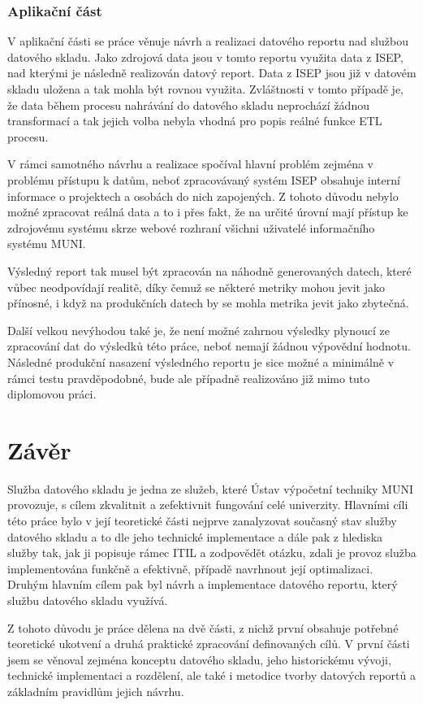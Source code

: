 \documentclass[
  digital,     %
  twoside,     %
  lof,         %
  lot,         %
]{fithesis4}
\begin{document}
\subsection{Aplikační část}
\label{dis-appli}
V aplikační části se práce věnuje návrh a realizaci datového reportu nad službou datového skladu. Jako zdrojová data jsou v tomto reportu využita data z ISEP, nad kterými je následně realizován datový report. Data z ISEP jsou již v datovém skladu uložena a tak mohla být rovnou využita. Zvláštnosti v tomto případě je, že data během procesu nahrávání do datového skladu neprochází žádnou transformací a tak jejich volba nebyla vhodná pro popis reálné funkce ETL procesu.

V rámci samotného návrhu a realizace spočíval hlavní problém zejména v problému přístupu k datům, neboť zpracovávaný systém ISEP obsahuje interní informace o projektech a osobách do nich zapojených. Z tohoto důvodu nebylo možné zpracovat reálná data a to i přes fakt, že na určité úrovní mají přístup ke zdrojovému systému skrze webové rozhraní všichni uživatelé informačního systému MUNI. 

Výsledný report tak musel být zpracován na náhodně generovaných datech, které vůbec neodpovídají realitě, díky čemuž se některé metriky mohou jevit jako přínosné, i když na produkčních datech by se mohla metrika jevit jako zbytečná.

Další velkou nevýhodou také je, že není možné zahrnou výsledky plynoucí ze zpracování dat do výsledků této práce, neboť nemají žádnou výpovědní hodnotu. Následné produkční nasazení výsledného reportu je sice možné a minimálně v rámci testu pravděpodobné, bude ale případně realizováno již mimo tuto diplomovou práci.  

\chapter{Závěr}
Služba datového skladu je jedna ze služeb, které Ústav výpočetní techniky MUNI provozuje, s cílem zkvalitnit a zefektivnit fungování celé univerzity. Hlavními cíli této práce bylo v její teoretické části nejprve zanalyzovat současný stav služby datového skladu a to dle jeho technické implementace a dále pak z hlediska služby tak, jak ji popisuje rámec ITIL a zodpovědět otázku, zdali je provoz služba implementována funkčně a efektivně, případě navrhnout její optimalizaci. Druhým hlavním cílem pak byl návrh a implementace datového reportu, který službu datového skladu využívá.

Z tohoto důvodu je práce dělena na dvě části, z nichž první obsahuje potřebné teoretické ukotvení a druhá praktické zpracování definovaných cílů. V první části jsem se věnoval zejména konceptu datového skladu, jeho historickému vývoji, technické implementaci a rozdělení, ale také i metodice tvorby datových reportů a základním pravidlům jejich návrhu. 
\end{document}
